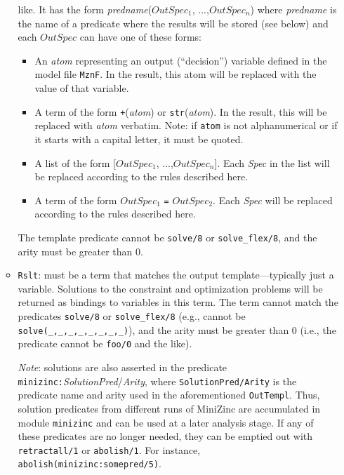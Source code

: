 \begin{itemize}
\begin{itemize}
    like. It has the form \emph{predname}($OutSpec_1$, ...,$OutSpec_n$)
    where \emph{predname} is the name of a predicate
    where the results will be stored (see below)
    and each $OutSpec$ can have one of these forms:
    \begin{itemize}
    \item  An \emph{atom} representing an output (``decision'') variable
      defined in the model file \texttt{MznF}.
      In the result, this atom will be replaced with the value of that variable.
    \item  A term of the form \texttt{+}(\emph{atom}) or
      \texttt{str}(\emph{atom}).  In the result, this will be replaced with
      \emph{atom} verbatim. Note: if \texttt{atom} is not alphanumerical or
      if it starts with a capital letter, it must be quoted.

    \item A list of the form [$OutSpec_1$, ...,$OutSpec_n$]. Each
      \emph{Spec} in the list will be replaced according to the rules
      described here.
    \item A term of the form $OutSpec_1$ \texttt{=} $OutSpec_2$. Each
      \emph{Spec} will be replaced according to the rules described here.
    \end{itemize}
    The template predicate cannot be \texttt{solve/8} or \texttt{solve\_flex/8},
    and the arity must be greater than 0.  
  \item \texttt{Rslt}: must be a term that matches the output
    template---typically just a variable.  Solutions to the constraint and optimization problems
    will be returned as bindings to variables in this term.
    The term cannot match the predicates
    \texttt{solve/8} or \texttt{solve\_flex/8} (e.g., cannot be
    \texttt{solve(\_,\_,\_,\_,\_,\_,\_,\_)}), and the
    arity must be greater than 0 (i.e., the predicate cannot be
    \texttt{foo/0} and the like).  

    \emph{Note}: solutions are also asserted in the predicate
    \texttt{minizinc:}\emph{SolutionPred}/\emph{Arity}, where
    \texttt{SolutionPred/Arity} is the predicate name and arity used in
    the aforementioned
    \texttt{OutTempl}.  Thus, solution predicates from different runs of
    MiniZinc are accumulated  in module \texttt{minizinc} and can be used
    at a later analysis stage. If any of these predicates are no longer
    needed, they can be emptied out with \texttt{retractall/1} or
    \texttt{abolish/1}. 
    For instance, \texttt{abolish(minizinc:somepred/5)}. 


\end{itemize}
\end{itemize}
